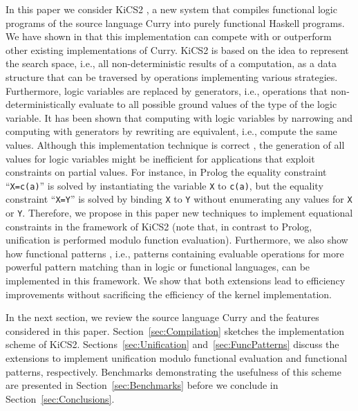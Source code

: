 \documentclass{llncs}
\newcommand{\code}[1]{\mbox{\small\texttt{#1}}}
\newcommand{\ccode}[1]{``\code{#1}''}
\begin{document}
In this paper we consider KiCS2 \cite{BrasselHanusPeemoellerReck11},
a new system that compiles functional logic programs of the
source language Curry \cite{Hanus06Curry}
into purely functional Haskell programs.
We have shown in \cite{BrasselHanusPeemoellerReck11}
that this implementation can compete with or outperform
other existing implementations of Curry.
KiCS2 is based on the idea to represent
the search space, i.e., all non-deterministic results of a computation,
as a data structure that can be traversed by operations
implementing various strategies.
Furthermore, logic variables are replaced by generators,
i.e., operations that non-deterministically evaluate to
all possible ground values of the type of the logic variable.
It has been shown \cite{AntoyHanus06ICLP}
that computing with logic variables by narrowing \cite{Reddy85,Slagle74}
and computing with generators by rewriting
are equivalent, i.e., compute the same values.
Although this implementation technique is correct \cite{Brassel11Thesis},
the generation of all values for logic variables
might be inefficient for applications that
exploit constraints on partial values.
For instance, in Prolog the equality constraint \ccode{X=c(a)}
is solved by instantiating the variable \code{X} to \code{c(a)},
but the equality constraint \ccode{X=Y} is solved by binding \code{X}
to \code{Y} without enumerating any values for \code{X} or \code{Y}.
Therefore, we propose in this paper new techniques
to implement equational constraints in the framework of KiCS2
(note that, in contrast to Prolog, unification is performed
modulo function evaluation).
Furthermore, we also show how functional patterns \cite{AntoyHanus05LOPSTR},
i.e., patterns containing evaluable operations for more powerful pattern 
matching than in logic or functional languages,
can be implemented in this framework.
We show that both extensions lead to efficiency improvements
without sacrificing the efficiency of the kernel implementation.

In the next section, we review the source language Curry
and the features considered in this paper.
Section~\ref{sec:Compilation} sketches the implementation scheme
of KiCS2.
Sections~\ref{sec:Unification} and~\ref{sec:FuncPatterns}
discuss the extensions to implement unification modulo
functional evaluation and functional patterns, respectively.
Benchmarks demonstrating the usefulness of this scheme
are presented in Section~\ref{sec:Benchmarks}
before we conclude in Section~\ref{sec:Conclusions}.
\end{document}
